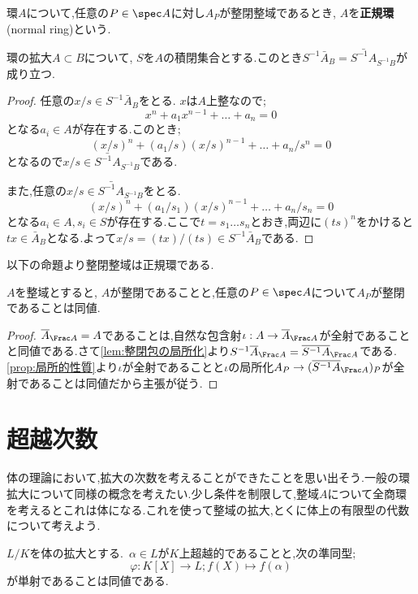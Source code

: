 \begin{defi}[正規環]
	環$A$について,任意の$P\in\spec A$に対し$A_P$が整閉整域であるとき, $A$を\textbf{正規環}(normal ring)という.
\end{defi}

\begin{lem}\label{lem:整閉包の局所化}
	環の拡大$A\subset B$について, $S$を$A$の積閉集合とする.このとき$S^{-1}\bar{A}_B=\bar{S^{-1}A}_{S^{-1}B}$が成り立つ.
\end{lem}

\begin{proof}
	任意の$x/s\in S^{-1}\bar{A}_B$をとる. $x$は$A$上整なので;
	\[x^n+a_1x^{n-1}+\dots+a_n=0\]
	となる$a_i\in A$が存在する.このとき;
	\[(x/s)^n+(a_1/s)(x/s)^{n-1}+\dots+a_n/s^n=0\]
	となるので$x/s\in\bar{S^{-1}A}_{S^{-1}B}$である.
	
	また,任意の$x/s\in\bar{S^{-1}A}_{S^{-1}B}$をとる.
	\[(x/s)^n+(a_1/s_1)(x/s)^{n-1}+\dots+a_n/s_n=0\]
	となる$a_i\in A,s_i\in S$が存在する.ここで$t=s_1\dots s_n$とおき,両辺に$(ts)^n$をかけると$tx\in\bar{A}_B$となる.よって$x/s=(tx)/(ts)\in S^{-1}\bar{A}_B$である.
\end{proof}

以下の命題より整閉整域は正規環である.
\begin{prop}\label{prop:整域の整閉性はlocal}
	$A$を整域とすると, $A$が整閉であることと,任意の$P\in\spec A$について$A_P$が整閉であることは同値.
\end{prop}

\begin{proof}
	$\bar{A}_{\Frac A}=A$であることは,自然な包含射$\iota:A\to \bar{A}_{\Frac A}$が全射であることと同値である.さて\ref{lem:整閉包の局所化}より$S^{-1}\bar{A}_{\Frac A}=\bar{S^{-1}A}_{\Frac A}$である.\ref{prop:局所的性質}より$\iota$が全射であることと$\iota$の局所化$A_P\to (\bar{S^{-1}A}_{\Frac A})_P$が全射であることは同値だから主張が従う.
\end{proof}

\section{超越次数}
体の理論において,拡大の次数を考えることができたことを思い出そう.一般の環拡大について同様の概念を考えたい.少し条件を制限して,整域$A$について全商環を考えるとこれは体になる.これを使って整域の拡大,とくに体上の有限型の代数について考えよう.

\begin{prop}
	$L/K$を体の拡大とする.~$\alpha\in L$が$K$上超越的であることと,次の準同型;
	\[\varphi:K[X]\longrightarrow L;f(X)\longmapsto f(\alpha)\]
	が単射であることは同値である.
\end{prop}

